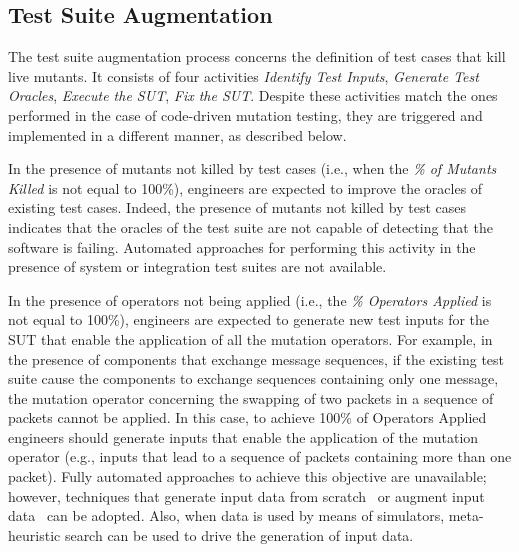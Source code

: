 
\subsection{Test Suite Augmentation} %
\label{sec:data:test_suite_augmentation}

The test suite augmentation process concerns the definition of test cases that kill live mutants.
It consists of four activities \emph{Identify Test Inputs}, \emph{Generate Test Oracles}, \emph{Execute the SUT}, \emph{Fix the SUT}. 
Despite these activities match the ones performed in the case of code-driven mutation testing, they are triggered and implemented in a different manner, as described below.




In the presence of mutants not killed by test cases (i.e., when the \emph{\% of Mutants Killed} is not equal to 100\%), engineers are expected to improve the oracles of existing test cases. Indeed, the presence of mutants not killed by test cases indicates that the oracles of the test suite are not capable of detecting that the software is failing. 
Automated approaches for performing this activity in the presence of system or integration test suites are not available.

In the presence of operators not being applied (i.e., the \emph{\% Operators Applied} is not equal to 100\%), engineers are expected to generate new test inputs for the SUT that enable the application of all the mutation operators. 
For example, in the presence of components that exchange message sequences, if the existing test suite cause the components to exchange sequences containing only one message, the mutation operator concerning the swapping of two packets in a sequence of packets cannot be applied. In this case, to achieve 100\% of Operators Applied engineers should generate inputs that enable the application of the mutation operator (e.g., inputs that lead to a sequence of packets containing more than one packet). 
Fully automated approaches to achieve this objective are unavailable; however, techniques that generate input data from scratch~\cite{gligoric2010test} or augment input data~\cite{DiNardo:TOSEM:2017} can be adopted. 
Also, when data is used by means of simulators, meta-heuristic search can be used to drive the generation of input data. 

